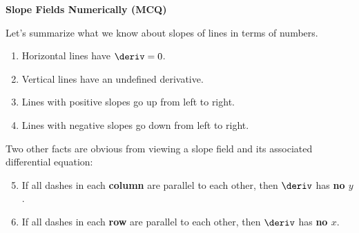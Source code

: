 \bigskip

\textbf{\large{Slope Fields Numerically (MCQ)}} \par

Let's summarize what we know about slopes of lines in terms of numbers. \begin{enumerate}
    \item Horizontal lines have $\deriv = 0$. \\
    \item Vertical lines have an undefined derivative. \\
    \item Lines with positive slopes go up from left to right. \\
    \item Lines with negative slopes go down from left to right.
\end{enumerate}
Two other facts are obvious from viewing a slope field and its associated differential equation: \begin{enumerate}
    \setcounter{enumi}{4}
    \item If all dashes in each \textbf{column} are parallel to each other, then $\deriv$ has \textbf{no $y$}. \\
    \item If all dashes in each \textbf{row} are parallel to each other, then $\deriv$ has \textbf{no $x$}.
\end{enumerate}
